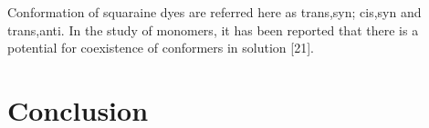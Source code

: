 \documentclass[journal=jacsat,manuscript=article]{achemso}
\begin{document}
Conformation of squaraine dyes are referred here as trans,syn; cis,syn and trans,anti. In the study of monomers, it has been reported that there is a potential for coexistence of conformers in solution [21]⁠.

\section{Conclusion}


\newpage
 

\end{document}

